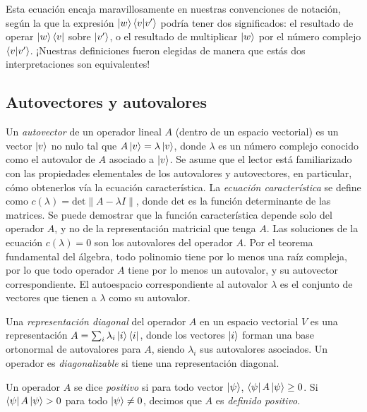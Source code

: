 Esta ecuación encaja maravillosamente en nuestras convenciones de notación, según la que la expresión $\ket{w}\braket{v|v'}$ podría tener dos significados: el resultado de operar $\ket{w}\bra{v}$ sobre $\ket{v'}$, o el resultado de multiplicar $\ket{w}$ por el número complejo $\braket{v|v'}$. ¡Nuestras definiciones fueron elegidas de manera que estás dos interpretaciones son equivalentes!



\subsection{Autovectores y autovalores}

Un \emph{autovector} de un operador lineal $A$ (dentro de un espacio vectorial) es un vector $\ket{v}$ no nulo tal que $A\ket{v}=\lambda \ket{v}$, donde $\lambda$ es un número complejo conocido como el autovalor de $A$ asociado a $\ket{v}$. Se asume que el lector está familiarizado con las propiedades elementales de los autovalores y autovectores, en particular, cómo obtenerlos vía la ecuación característica. La \emph{ecuación característica} se define como $c(\lambda) = \text{det} \| A - \lambda I\|$, donde $\text{det}$ es la función determinante de las matrices. Se puede demostrar que la función característica depende solo del operador $A$, y no de la representación matricial que tenga $A$. Las soluciones de la ecuación $c(\lambda) = 0$ son los autovalores del operador $A$. Por el teorema fundamental del álgebra, todo polinomio tiene por lo menos una raíz compleja, por lo que todo operador $A$ tiene por lo menos un autovalor, y su autovector correspondiente. El autoespacio correspondiente al autovalor $\lambda$ es el conjunto de vectores que tienen a $\lambda$ como su autovalor. %

\begin{definicion}
    Una \emph{representación diagonal} del operador $A$ en un espacio vectorial $V$ es una representación $A = \sum_i \lambda_i \ket{i}\bra{i}$, donde los vectores $\ket{i}$ forman una base ortonormal de autovalores para $A$, siendo $\lambda_i$ sus autovalores asociados. Un operador es \emph{diagonalizable} si tiene una representación diagonal.
\end{definicion}

\begin{definicion}
Un operador $A$ se dice \emph{positivo} si para todo
  vector $\ket\psi$, $\bra\psi A\ket\psi\geq 0$. Si $\bra\psi A\ket\psi >0$ para
  todo $\ket\psi\neq 0$, decimos que $A$ es \emph{definido positivo}.
\end{definicion}

